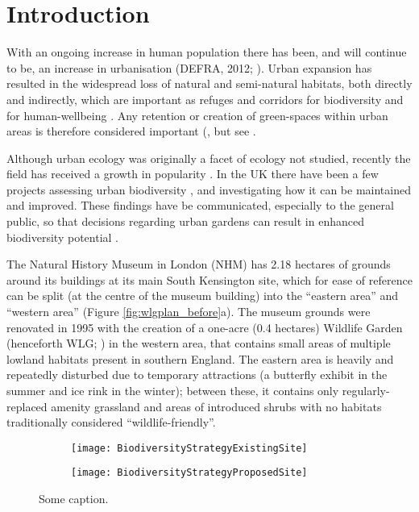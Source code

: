 \section{Introduction}

With an ongoing increase in human population there has been, and will continue to be, an increase in urbanisation (DEFRA, 2012; \citep{unitednations:2014wg}). Urban expansion has resulted in the widespread loss of natural and semi-natural habitats, both directly and indirectly, which are important as refuges and corridors for biodiversity \citep{Goulson:2002oe,Osborne:2008jpe} and for human-wellbeing \citep{Fuller:2007bl, Dallimer:2012bs, Bratman:2015nature, Shanahan:2016sr}. Any retention or creation of green-spaces within urban areas is therefore considered important (\citealt{Alvey:2006uf}, but see \citealt{Dearborn:2010cb}.

Although urban ecology was originally a facet of ecology not studied, recently the field has received a growth in popularity \citep{Mcphearson:2016Bs}.  In the UK there have been a few projects assessing urban biodiversity \citep{Gaston:2004bugs,Angold:2006ste}, and investigating how it can be maintained and improved. These findings have be communicated, especially to the general public, so that decisions regarding urban gardens can result in enhanced biodiversity potential \citep[e.g.][]{Thompson:2007no}.

The Natural History Museum in London (NHM) has 2.18 hectares of grounds around its buildings at its main South Kensington site, which for ease of reference can be split (at the centre of the museum building) into the ``eastern area'' and ``western area'' (Figure \ref{fig:wlgplan_before}a). The museum grounds were renovated in 1995 with the creation of a one-acre (0.4 hectares) Wildlife Garden (henceforth WLG; \citealt{Honey:1999ln}) in the western area, that contains small areas of multiple lowland habitats present in southern England. The eastern area is heavily and repeatedly disturbed due to temporary attractions (a butterfly exhibit in the summer and ice rink in the winter); between these, it contains only regularly-replaced amenity grassland and areas of introduced shrubs with no habitats traditionally considered ``wildlife-friendly''. 


\begin{figure}
	\centering

	\begin{subfigure}[t]{0.45\textwidth}
		\centering
		\texttt{[image: BiodiversityStrategyExistingSite]}
       		 \caption{}\label{fig:fig_a}
	\end{subfigure}
%
	\begin{subfigure}[t]{0.45\textwidth}
		\centering
		\texttt{[image: BiodiversityStrategyProposedSite]}
		\caption{}\label{fig:fig_b}
	\end{subfigure}
	\caption{Some caption.}
\end{figure}

